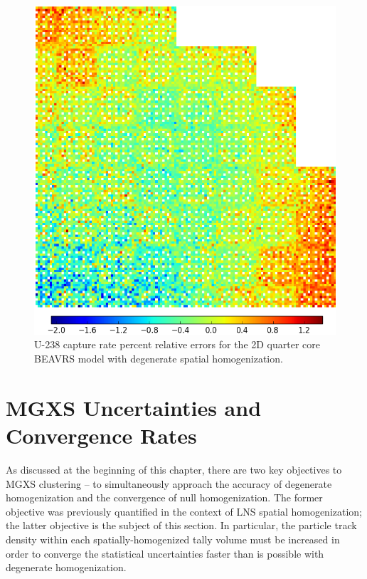 \begin{figure}[h!]
\centering
\includegraphics[width=\linewidth]{figures/patterns/lns/full-core/capt-err-degenerate}
\vspace{2mm}
\caption[U-238 capture rate errors for \ac{BEAVRS} with degenerate homogenization]{U-238 capture rate percent relative errors for the 2D quarter core \ac{BEAVRS} model with degenerate spatial homogenization.}
\label{fig:chap9-full-core-capt-err-degenerate}
\end{figure}

\clearpage


\section{MGXS Uncertainties and Convergence Rates}
\label{sec:chap9-convergence}

As discussed at the beginning of this chapter, there are two key objectives to \ac{MGXS} clustering -- to simultaneously approach the accuracy of degenerate homogenization and the convergence of null homogenization. The former objective was previously quantified in the context of \ac{LNS} spatial homogenization; the latter objective is the subject of this section. In particular, the particle track density within each spatially-homogenized tally volume must be increased in order to converge the statistical uncertainties faster than is possible with degenerate homogenization.

